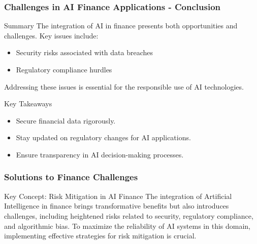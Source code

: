 \documentclass[aspectratio=169]{beamer}
\begin{document}
\begin{frame}[fragile]
    \frametitle{Challenges in AI Finance Applications - Conclusion}
    \begin{block}{Summary}
        The integration of AI in finance presents both opportunities and challenges. Key issues include:
        \begin{itemize}
            \item Security risks associated with data breaches
            \item Regulatory compliance hurdles
        \end{itemize}
        Addressing these issues is essential for the responsible use of AI technologies.
    \end{block}
    
    \begin{block}{Key Takeaways}
        \begin{itemize}
            \item Secure financial data rigorously.
            \item Stay updated on regulatory changes for AI applications.
            \item Ensure transparency in AI decision-making processes.
        \end{itemize}
    \end{block}
\end{frame}

\begin{frame}[fragile]
    \frametitle{Solutions to Finance Challenges}
    \begin{block}{Key Concept: Risk Mitigation in AI Finance}
        The integration of Artificial Intelligence in finance brings transformative benefits but also introduces challenges, including heightened risks related to security, regulatory compliance, and algorithmic bias. 
        To maximize the reliability of AI systems in this domain, implementing effective strategies for risk mitigation is crucial.
    \end{block}
\end{frame}
\end{document}
